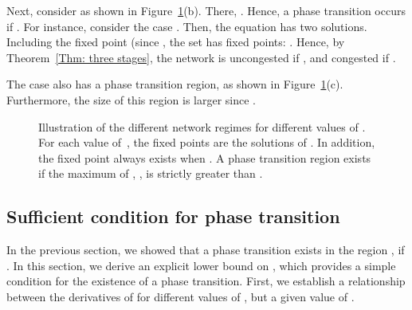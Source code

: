\documentclass{IEEEtran}
\begin{document}
Next, consider  as shown in Figure~\ref{number_of_fixed_points}(b). There, . Hence, a phase transition
occurs if . For instance, consider the case . Then, the equation  has two solutions.
Including the fixed point  (since , the set  has   fixed points: . Hence, by Theorem~\ref{Thm: three stages}, the network is uncongested if , and congested if .

The case  also has a phase transition region, as shown in Figure~\ref{number_of_fixed_points}(c). Furthermore, the size of this region is
larger since .





\begin{figure}[!t]
\centering
{}
\caption{Illustration of the different network regimes for different values of . For each value of~, the fixed points are the solutions of
. In addition, the fixed point  always exists when . A phase transition region exists if the maximum of
, , is strictly greater than .}
\label{number_of_fixed_points}
\end{figure}





\subsection{Sufficient condition for phase transition}
\label{The sufficient condition for phase transition}
In the previous section, we showed that a phase transition exists in the region , if . In this section, we
derive an explicit lower bound on , which provides a simple  condition for the existence of a phase transition. First, we establish a
relationship between the derivatives of  for different values of , but a given value of .
\end{document}

